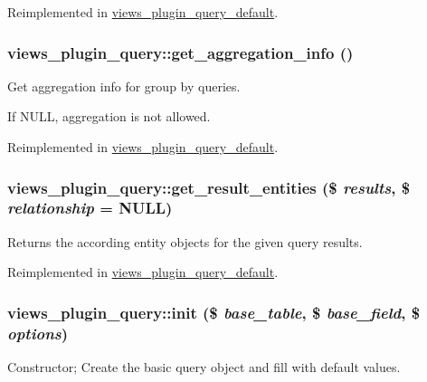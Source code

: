 Reimplemented in \hyperlink{classviews__plugin__query__default_a70d7f2ebdf1988941432d1c6ba311b03}{views\_\-plugin\_\-query\_\-default}.\hypertarget{classviews__plugin__query_a0628a8a185bd8d5717887dcdd9dae7db}{
\subsubsection[{get\_\-aggregation\_\-info}]{\setlength{\rightskip}{0pt plus 5cm}views\_\-plugin\_\-query::get\_\-aggregation\_\-info ()}}
\label{classviews__plugin__query_a0628a8a185bd8d5717887dcdd9dae7db}
Get aggregation info for group by queries.

If NULL, aggregation is not allowed. 

Reimplemented in \hyperlink{classviews__plugin__query__default_a07be1c437984cac29d608041e8378c2f}{views\_\-plugin\_\-query\_\-default}.\hypertarget{classviews__plugin__query_a36cb34e719977950d9d78a4f11f761a8}{
\subsubsection[{get\_\-result\_\-entities}]{\setlength{\rightskip}{0pt plus 5cm}views\_\-plugin\_\-query::get\_\-result\_\-entities (\$ {\em results}, \/  \$ {\em relationship} = {\ttfamily NULL})}}
\label{classviews__plugin__query_a36cb34e719977950d9d78a4f11f761a8}
Returns the according entity objects for the given query results. 

Reimplemented in \hyperlink{classviews__plugin__query__default_ad6e3fe94f3e287c1b8f2c7a9d567066d}{views\_\-plugin\_\-query\_\-default}.\hypertarget{classviews__plugin__query_a56239b387c0634fde577cbb355abff9d}{
\subsubsection[{init}]{\setlength{\rightskip}{0pt plus 5cm}views\_\-plugin\_\-query::init (\$ {\em base\_\-table}, \/  \$ {\em base\_\-field}, \/  \$ {\em options})}}
\label{classviews__plugin__query_a56239b387c0634fde577cbb355abff9d}
Constructor; Create the basic query object and fill with default values. 

